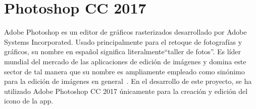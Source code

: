 \section{Photoshop CC 2017}
Adobe Photoshop es un editor de gráficos rasterizados desarrollado por Adobe Systems Incorporated. Usado principalmente para el retoque de fotografías y gráficos, su nombre en español significa literalmente``taller de fotos''. Es líder mundial del mercado de las aplicaciones de edición de imágenes y domina este sector de tal manera que su nombre es ampliamente empleado como sinónimo para la edición de imágenes en general~\cite{wiki:adobephotoshop}. 
En el desarrollo de este proyecto, se ha utilizado Adobe Photoshop CC 2017 únicamente para la creación y edición del icono de la app.
